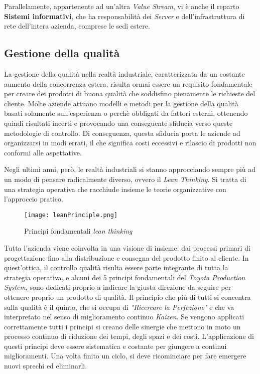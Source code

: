 Parallelamente, appartenente ad un'altra \textit{Value Stream}, vi è anche il reparto \textbf{Sistemi informativi}, che ha responsabilità dei \textit{Server} e dell'infrastruttura di rete dell'intera azienda, comprese le sedi estere.



\subsection{Gestione della qualità}
La gestione della qualità nella realtà industriale, caratterizzata da un costante aumento della concorrenza estera, risulta ormai essere un requisito fondamentale per creare dei prodotti di buona qualità che soddisfino pienamente le richieste del cliente. 
Molte aziende attuano modelli e metodi per la gestione della qualità basati solamente sull'esperienza o perchè obbligati da fattori esterni, ottenendo quindi risultati incerti e provocando una conseguente sfiducia verso queste metodologie di controllo. Di conseguenza, questa sfiducia porta le aziende ad organizzarsi in modi errati, il che significa costi eccessivi e rilascio di prodotti non conformi alle aspettative. 

Negli ultimi anni, però, le realtà industriali si stanno approcciando sempre più ad un modo di pensare radicalmente diverso, ovvero il \textit{Lean Thinking}. Si tratta di una strategia operativa che racchiude insieme le teorie organizzative con l'approccio pratico. 

\begin{figure}[H]
  \centering
  \texttt{[image: leanPrinciple.png]}
  \caption{Principi fondamentali \textit{lean thinking}}
\end{figure}

Tutta l'azienda viene coinvolta in una visione di insieme: dai processi primari di progettazione fino alla distribuzione e consegna del prodotto finito al cliente. In quest'ottica, il controllo qualità risulta essere parte integrante di tutta la strategia operativa, e alcuni dei 5 principi fondamentali del \textit{Toyota Production System}, sono dedicati proprio a indicare la giusta direzione da seguire per ottenere proprio un prodotto di qualità. Il principio che più di tutti si concentra sulla qualità è il quinto, che si occupa di \textit{"Ricercare la Perfezione"} e che va interpretato nel senso di miglioramento continuo \textit{Kaizen}. Se vengono applicati correttamente tutti i principi si creano delle sinergie che mettono in moto un processo continuo di riduzione dei tempi, degli spazi e dei costi. L'applicazione di questi principi deve essere sistematica e costante per giungere a continui miglioramenti. Una volta finito un ciclo, si deve ricominciare per fare emergere nuovi sprechi ed eliminarli. 

